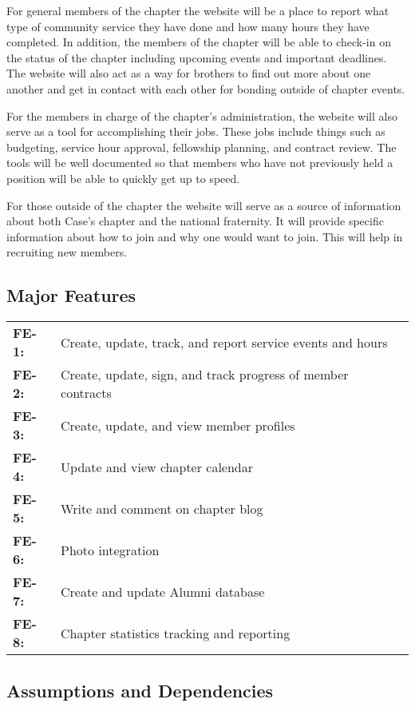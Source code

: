 \documentclass[11pt,letterpaper,rotate]{article}
\begin{document}
\indent\indent For general members of the chapter the website will be a place to report what type of community service they have done and how many hours they have completed. In addition, the members of the chapter will be able to check-in on the status of the chapter including upcoming events and important deadlines. The website will also act as a way for brothers to find out more about one another and get in contact with each other for bonding outside of chapter events.

For the members in charge of the chapter's administration, the website will also serve as a tool for accomplishing their jobs. These jobs include things such as budgeting, service hour approval, fellowship planning, and contract review. The tools will be well documented so that members who have not previously held a position will be able to quickly get up to speed.

For those outside of the chapter the website will serve as a source of information about both Case's chapter and the national fraternity. It will provide specific information about how to join and why one would want to join. This will help in recruiting new members.

\subsection{Major Features}

\begin{longtable}{lp{12cm}}
{\bf FE-1:} & Create, update, track, and report service events and
hours \\
{\bf FE-2:} &Create, update, sign, and track progress of member
contracts \\
{\bf FE-3: } &Create, update, and view member profiles\\
{\bf FE-4: } &Update and view chapter calendar\\
{\bf FE-5: } &Write and comment on chapter blog\\
{\bf FE-6: } &Photo integration\\
{\bf FE-7: } &Create and update Alumni database\\
{\bf FE-8: } &Chapter statistics tracking and reporting\\
\end{longtable}


\subsection{Assumptions and Dependencies}
\end{document}
